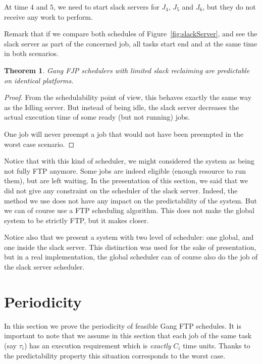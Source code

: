 \documentclass[a4paper]{article}
\newtheorem{theorem}{Theorem}
\begin{document}
At time $4$ and $5$, we need to start slack servers for $J_4$, $J_5$ and $J_6$, but they do not receive any work to perform.

Remark that if we compare both schedules of Figure~\ref{fig:slackServer}, and see the slack server as part of the concerned job, all tasks start end and at the same time in both scenarios.

\begin{theorem}\label{thm:slack} Gang FJP schedulers with limited slack reclaiming are predictable on identical platforms.
\end{theorem}

\begin{proof}
From the schedulability point of view, this behaves exactly the same way as the Idling server. But instead of being idle, the slack server decreases the actual execution time of some ready (but not running) jobs.

One job will never preempt a job that would not have been preempted in the worst case scenario.
\end{proof}

Notice that with this kind of scheduler, we might considered the system as being not fully FTP anymore. Some jobs are indeed eligible (enough resource to run them), but are left waiting. In the presentation of this section, we said that we did not give any constraint on the scheduler of the slack server. Indeed, the method we use does not have any impact on the predictability of the system. But we can of course use a FTP scheduling algorithm. This does not make the global system to be strictly FTP, but it makes closer.

Notice also that we present a system with two level of scheduler: one global, and one inside the slack server. This distinction was used for the sake of presentation, but in a real implementation, the global scheduler can of course also do the job of the slack server scheduler.

\section{Periodicity}\label{sec:periodicity}
In this section we prove the periodicity of feasible Gang FTP schedules. It is important to note that we assume in this section that each job of the same task (say $\tau_{i}$) has an execution requirement which is \emph{exactly} $C_{i}$ time units. Thanks to the predictability property this situation corresponds to the worst case.
\end{document}
